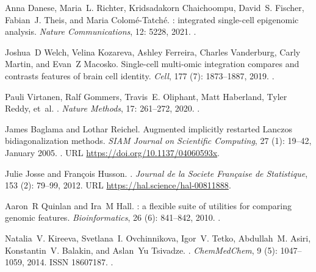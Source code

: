 \documentclass[10pt]{article}
\begin{document}
\begin{thebibliography}{31}
	Anna Danese, Maria~L. Richter, Kridsadakorn Chaichoompu, David~S. Fischer,
	Fabian~J. Theis, and Maria Colomé-Tatché.
	: integrated single-cell epigenomic analysis.
	\newblock \emph{Nature Communications}, 12: 5228, 2021.
	\newblock {}.
	
	Joshua~D Welch, Velina Kozareva, Ashley Ferreira, Charles Vanderburg, Carly
	Martin, and Evan~Z Macosko.
	\newblock Single-cell multi-omic integration compares and contrasts features of
	brain cell identity.
	\newblock \emph{Cell}, 177 (7): 1873--1887, 2019.
	\newblock {}.
	
	Pauli Virtanen, Ralf Gommers, Travis~E. Oliphant, Matt Haberland, Tyler Reddy,
	et~al.
	.
	\newblock \emph{Nature Methods}, 17: 261--272, 2020.
	\newblock {}.
	
	James Baglama and Lothar Reichel.
	\newblock Augmented implicitly restarted {Lanczos} bidiagonalization methods.
	\newblock \emph{{SIAM} Journal on Scientific Computing}, 27
	(1): 19--42, January 2005.
	\newblock {}.
	\newblock URL \url{https://doi.org/10.1137/04060593x}.
	
	Julie Josse and Fran{\c c}ois Husson.
	.
	\newblock \emph{{Journal de la Societe Fran{\c c}aise de Statistique}},
	153 (2): 79--99, 2012.
	\newblock URL \url{https://hal.science/hal-00811888}.
	
	Aaron~R Quinlan and Ira~M Hall.
	: a flexible suite of utilities for comparing genomic
	features.
	\newblock \emph{Bioinformatics}, 26 (6): 841--842, 2010.
	\newblock {}.
	
	Natalia~V. Kireeva, Svetlana~I. Ovchinnikova, Igor~V. Tetko, Abdullah~M. Asiri,
	Konstantin~V. Balakin, and Aslan~Yu Tsivadze.
	.
	\newblock \emph{ChemMedChem}, 9 (5): 1047--1059, 2014.
	\newblock ISSN 18607187.
	\newblock {}.
	

\end{thebibliography}
\end{document}
